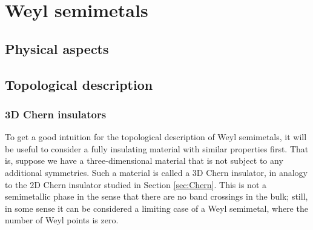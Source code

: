 \chapter{Weyl semimetals}

\section{Physical aspects}


\section{Topological description}


\subsection{3D Chern insulators}


To get a good intuition for the topological description of Weyl semimetals, it will be useful to consider a fully insulating material with similar properties first. That is, suppose we have a three-dimensional material that is not subject to any additional symmetries. Such a material is called a 3D Chern insulator, in analogy to the 2D Chern insulator studied in Section \ref{sec:Chern}.%
This is not a semimetallic phase in the sense that there are no band crossings in the bulk; still, in some sense it can be considered a limiting case of a Weyl semimetal, where the number of Weyl points is zero.

